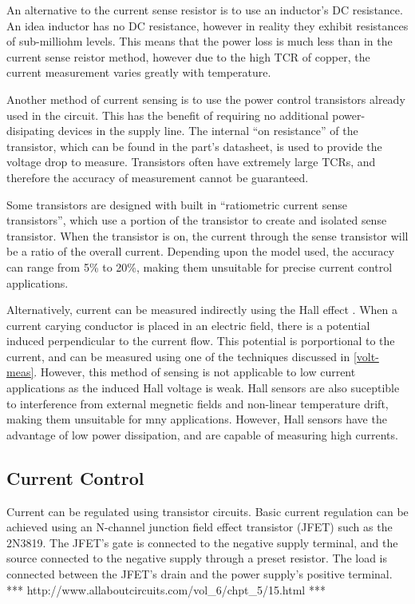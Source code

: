 An alternative to the current sense resistor is to use an inductor's DC resistance. An idea inductor has no DC resistance, however in reality they exhibit resistances of sub-milliohm levels. This means that the power loss is much less than in the current sense reistor method, however due to the high TCR of copper, the current measurement varies greatly with temperature.

Another method of current sensing is to use the power control transistors already used in the circuit. This has the benefit of requiring no additional power-disipating devices in the supply line. The internal ``on resistance'' of the transistor, which can be found in the part's datasheet, is used to provide the voltage drop to measure. Transistors often have extremely large TCRs, and therefore the accuracy of measurement cannot be guaranteed. 

Some transistors are designed with built in ``ratiometric current sense transistors'', which use a portion of the transistor to create and isolated sense transistor. When the transistor is on, the current through the sense transistor will be a ratio of the overall current. Depending upon the model used, the accuracy can range from 5\% to 20\%, making them unsuitable for precise current control applications.

Alternatively, current can be measured indirectly using the Hall effect \cite{hall}. When a current carying conductor is placed in an electric field, there is a potential induced perpendicular to the current flow. This potential is porportional to the current, and can be measured using one of the techniques discussed in \ref{volt-meas}. However, this method of sensing is not applicable to low current applications as the induced Hall voltage is weak. Hall sensors are also suceptible to interference from external megnetic fields and non-linear temperature drift, making them unsuitable for mny applications. However, Hall sensors have the advantage of low power dissipation, and are capable of measuring high currents.

\subsection{Current Control}
Current can be regulated using transistor circuits. Basic current regulation can be achieved  using an N-channel junction field effect transistor (JFET) such as the 2N3819. The JFET's gate is connected to the negative supply terminal, and the source connected to the negative supply through a preset resistor. The load is connected between the JFET's drain and the power supply's positive terminal.
*** http://www.allaboutcircuits.com/vol_6/chpt_5/15.html ***